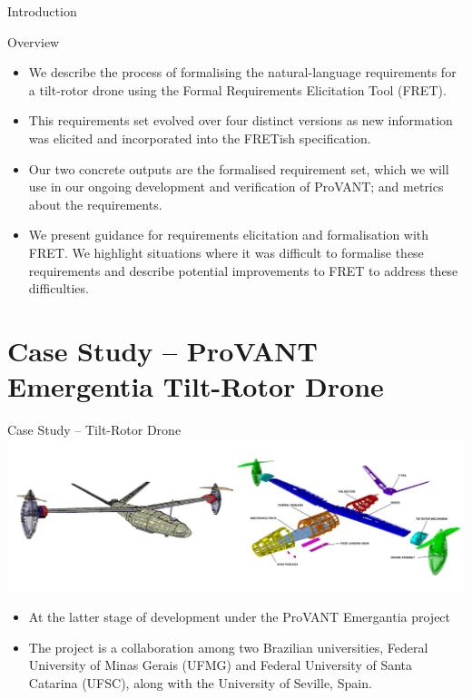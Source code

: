 \documentclass[11pt, aspectratio=169, table]{beamer}
\begin{document}
\begin{frame}{Introduction}

\begin{block}{Overview}

\begin{itemize}
    \item We describe the process of formalising the natural-language requirements for a tilt-rotor drone using the Formal Requirements Elicitation Tool (FRET).

    \item This requirements set evolved over four distinct versions as new information was elicited and incorporated into the FRETish specification.

    \item Our two concrete outputs are the formalised requirement set, which we will use in our ongoing development and verification of ProVANT; and metrics about the requirements.
    
    \item We present guidance for  requirements elicitation and formalisation with FRET.  
We highlight situations where it was difficult to formalise these requirements and describe potential improvements to FRET to address these difficulties.
	
\end{itemize}
\end{block}
\end{frame}

\section{Case Study -- ProVANT Emergentia Tilt-Rotor Drone}

\begin{frame}{Case Study -- Tilt-Rotor Drone}
\centering
\includegraphics[width=\textwidth]{images/drone-overview.png}
\vspace{-8mm}
\begin{block}{}
	\begin{itemize}
		\item At the latter stage of development under the ProVANT Emergantia project
		
		\item The project is a collaboration among two Brazilian universities, Federal University of Minas Gerais (UFMG) and Federal University of Santa Catarina (UFSC), along with the University of Seville, Spain.
	\end{itemize}
\end{block}
\end{frame}
\end{document}

